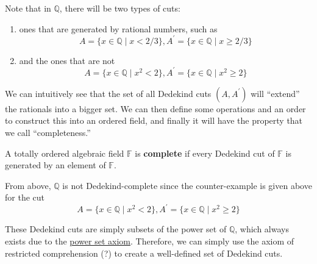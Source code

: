   Note that in $\mathbb{Q}$, there will be two types of cuts: 
  \begin{enumerate}
    \item ones that are generated by rational numbers, such as 
    \begin{equation}
      A = \{x \in \mathbb{Q} \mid x < 2/3 \}, A^\prime = \{ x \in \mathbb{Q} \mid x \geq 2/3 \} 
    \end{equation}
    \item and the ones that are not 
    \begin{equation}
      A = \{x \in \mathbb{Q} \mid x^2 < 2 \}, A^\prime = \{x \in \mathbb{Q} \mid x^2 \geq 2 \}
    \end{equation}
  \end{enumerate}
  We can intuitively see that the set of all Dedekind cuts $(A, A^\prime)$ will ``extend'' the rationals into a bigger set. We can then define some operations and an order to construct this into an ordered field, and finally it will have the property that we call ``completeness.''

  \begin{definition}
    A totally ordered algebraic field $\mathbb{F}$ is \textbf{complete} if every Dedekind cut of $\mathbb{F}$ is generated by an element of $\mathbb{F}$. 
  \end{definition}

  From above, $\mathbb{Q}$ is not Dedekind-complete since the counter-example is given above for the cut 
  \begin{equation}
    A = \{x \in \mathbb{Q} \mid x^2 < 2 \}, A^\prime = \{x \in \mathbb{Q} \mid x^2 \geq 2 \}
  \end{equation}

  These Dedekind cuts are simply subsets of the power set of $\mathbb{Q}$, which always exists due to the \hyperref[st-power-set-axiom]{power set axiom}. Therefore, we can simply use the axiom of restricted comprehension (?) to create a well-defined set of Dedekind cuts.    

